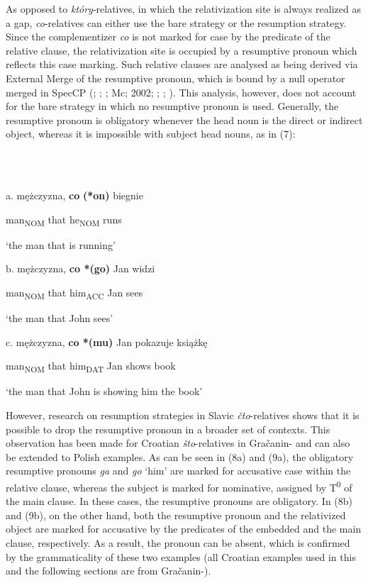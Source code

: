 \documentclass[output=paper]{langsci/langscibook}
\begin{document}
As opposed to \textit{który}{}-relatives, in which the relativization site is always realized as a gap, \textit{co}{}-relatives can either use the bare strategy or the resumption strategy. Since the complementizer \textit{co} is not marked for case by the predicate of the relative clause, the relativization site is occupied by a resumptive pronoun which reflects this case marking. Such relative clauses are analysed as being derived via External Merge of the resumptive pronoun, which is bound by a null operator merged in SpecCP (\citealt{Borer1984}; \citealt{Chomsky1977}; \citealt{Lavine2003}; Mc\citealt{Closkey1990}; 2002; \citealt{Merchant2004}; \citealt{Safir1986}; \citealt{Shlonsky1992}). This analysis, however, does not account for the bare strategy in which no resumptive pronoun is used. Generally, the resumptive pronoun is obligatory whenever the head noun is the direct or indirect object, whereas it is impossible with subject head nouns, as in (7):

\ea%
    \label{ex:key:7}
    \gll\\
        \\
    \glt
    \z

          a.   mężczyzna,   \textbf{co}   \textbf{(*on)} biegnie

man\textsubscript{NOM}   that   he\textsubscript{NOM} runs

‘the man that is running’

  b.   mężczyzna,   \textbf{co *(go)} Jan   widzi

    man\textsubscript{NOM}   that him\textsubscript{ACC}   Jan   sees

    ‘the man that John sees’

  c.   mężczyzna,   \textbf{co *(mu)}   Jan   pokazuje   książkę

    man\textsubscript{NOM}   that him\textsubscript{DAT}   Jan   shows   book

    ‘the man that John is showing him the book’

However, research on resumption strategies in Slavic \textit{čto}{}-relatives shows that it is possible to drop the resumptive pronoun in a broader set of contexts. This observation has been made for Croatian \textit{što}{}-relatives in Gračanin-\citet[29]{Yuksek2013} and can also be extended to Polish examples. As can be seen in (8a) and (9a), the obligatory resumptive pronouns \textit{ga} and \textit{go} ‘him’ are marked for accusative case within the relative clause, whereas the subject is marked for nominative, assigned by T\textsuperscript{0} of the main clause. In these cases, the resumptive pronouns are obligatory. In (8b) and (9b), on the other hand, both the resumptive pronoun and the relativized object are marked for accusative by the predicates of the embedded and the main clause, respectively. As a result, the pronoun can be absent, which is confirmed by the grammaticality of these two examples (all Croatian examples used in this and the following sections are from Gračanin-\citealt{Yuksek2013}). 
\end{document}
